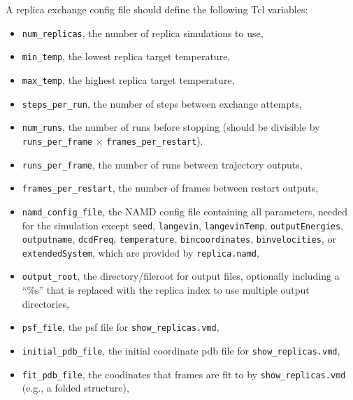 A replica exchange config file should define the following Tcl variables:
\begin{itemize}
\item {\tt num\_replicas}, the number of replica simulations to use,
\item {\tt min\_temp}, the lowest replica target temperature,
\item {\tt max\_temp}, the highest replica target temperature,
\item {\tt steps\_per\_run}, the number of steps between exchange attempts,
\item {\tt num\_runs}, the number of runs before stopping
(should be divisible by {\tt runs\_per\_frame} $\times$ {\tt frames\_per\_restart}).
\item {\tt runs\_per\_frame}, the number of runs between trajectory outputs,
\item {\tt frames\_per\_restart}, the number of frames between restart outputs,

\item {\tt namd\_config\_file}, the NAMD config file containing all parameters,
needed for the simulation except {\tt seed}, {\tt langevin}, 
{\tt langevinTemp}, {\tt outputEnergies},
{\tt outputname}, {\tt dcdFreq},
{\tt temperature}, {\tt bincoordinates}, {\tt binvelocities},
or {\tt extendedSystem}, which are provided by {\tt replica.namd},

\item {\tt output\_root}, the directory/fileroot for output files,
optionally including a ``\%s'' that is replaced with the replica index
to use multiple output directories,

\item {\tt psf\_file}, the psf file for {\tt show\_replicas.vmd}, 
\item {\tt initial\_pdb\_file}, the initial coordinate pdb file for {\tt show\_replicas.vmd},
\item {\tt fit\_pdb\_file}, the coodinates that frames are fit to by {\tt show\_replicas.vmd} (e.g., a folded structure),
\end{itemize}

